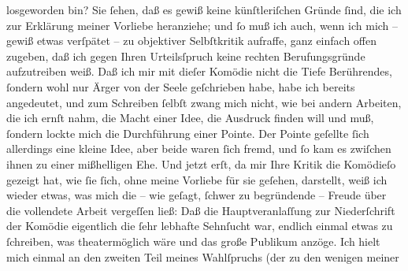 \begin{ledgroupsized}[t]{13cm}
                    losgeworden bin?\pend
           \pstart
           Sie ſehen, daß es gewiß keine künſtleriſchen Gründe ſind, die ich zur Erklärung
                    meiner Vorliebe heranziehe; und ſo muß ich auch, wenn {\pb}ich mich – gewiß etwas verſpätet – zu objektiver
                    Selbſtkritik aufraffe, ganz einfach offen zugeben, daß ich gegen Ihren
                    Urteilsſpruch keine rechten Berufungsgründe aufzutreiben weiß. Daß ich mir mit
                    dieſer Komödie nicht die Tiefe Berührendes, ſondern wohl nur Ärger von der Seele
                    geſchrieben habe, habe ich bereits angedeutet, und zum Schreiben ſelbſt zwang
                    mich nicht, wie bei andern Arbeiten, die ich ernſt nahm, die Macht einer Idee,
                    die Ausdruck finden will und muß, ſondern lockte mich die Durchführung einer
                    Pointe. Der Pointe geſellte ſich allerdings eine kleine Idee, aber beide waren
                    ſich fremd, und ſo kam es zwiſchen ihnen zu einer mißhelligen Ehe.\pend
           \pstart
           Und jetzt erſt, da mir Ihre Kritik die Komödieſo gezeigt hat, wie ſie ſich, ohne meine
                    Vorliebe für sie geſehen, darstellt, weiß ich
                    wieder etwas, was mich die – wie geſagt, ſchwer zu begründende – Freude über die
                    vollendete Arbeit vergeſſen ließ: Daß die Hauptveranlaſſung zur Niederſchrift
                    der Komödie eigentlich die ſehr lebhafte Sehnſucht war, endlich einmal etwas zu
                    ſchreiben, was theatermöglich wäre und das große Publikum anzöge. Ich hielt mich
                    einmal an den zweiten Teil meines Wahlſpruchs (der zu den wenigen meiner \label{K_L02215_1v}
\end{ledgroupsized}
